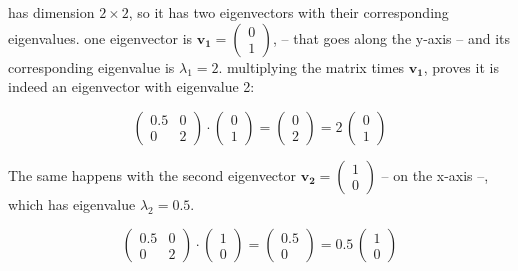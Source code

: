 \documentclass{tufte-book} %
\begin{document}
has dimension $2 \times 2$, so it has two eigenvectors with their corresponding eigenvalues. one eigenvector is $\mathbf{v_1}=\begin{pmatrix}  0\\ 1 \end{pmatrix} $,  -- that goes along the y-axis -- and its corresponding eigenvalue is $\lambda_1 = 2$. multiplying the matrix times $\mathbf{v_1}$, proves it is indeed an eigenvector with eigenvalue 2:

\begin{equation}
	\begin{pmatrix} 0.5 & 0\\ 0 &  2 \end{pmatrix} \cdot \begin{pmatrix}  0\\ 1 \end{pmatrix} = \begin{pmatrix}  0\\ 2 \end{pmatrix}= 2 \, \begin{pmatrix}  0\\ 1 \end{pmatrix}
\end{equation}

The same happens with the second eigenvector $\mathbf{v_2}=\begin{pmatrix}  1\\ 0 \end{pmatrix}$ -- on the x-axis --, which has eigenvalue $\lambda_2 = 0.5$.

\begin{equation}
	\begin{pmatrix} 0.5 & 0\\ 0 &  2 \end{pmatrix} \cdot \begin{pmatrix}  1\\ 0 \end{pmatrix} = \begin{pmatrix}  0.5\\ 0 \end{pmatrix}= 0.5 \, \begin{pmatrix}  1\\ 0 \end{pmatrix}
\end{equation}
\end{document}
